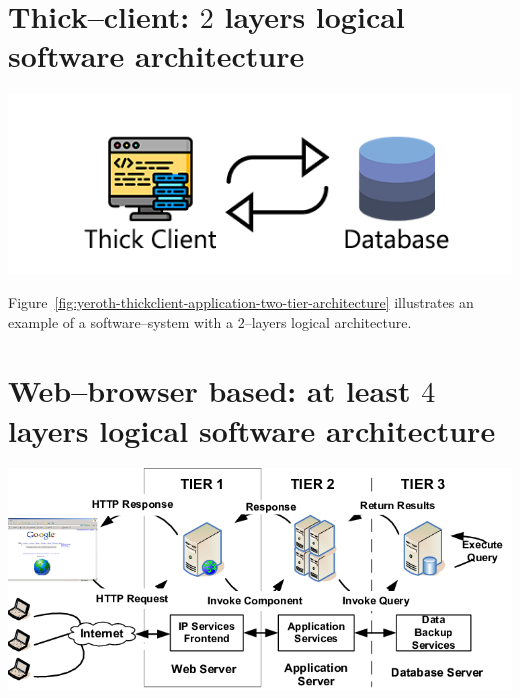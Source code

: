 \newpage


\section{Thick--client: $2$ layers logical software architecture}

\begin{center}
\includegraphics[scale=0.52]{images/yeroth-thickclient-application-two-tier-architecture.png}
\label{fig:yeroth-thickclient-application-two-tier-architecture}
\end{center}

Figure~\ref{fig:yeroth-thickclient-application-two-tier-architecture}
illustrates an example of a \thickclient
software--system with a $2$--layers
logical architecture.


\section{Web--browser based: at least $4$ layers logical software architecture}

\begin{center}
\includegraphics[scale=0.39]{images/yeroth-three-tier-architecture.png}
\label{fig:yeroth-three-tier-architecture}
\end{center}


